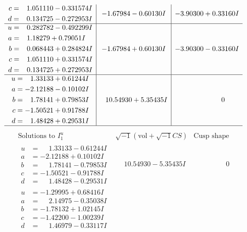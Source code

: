 \documentclass[1p]{elsarticle_modified}
\theoremstyle{definition}
\newcommand{\I}{\sqrt{-1}}
\begin{document}
$$\begin{array}{c|c|c}
\begin{aligned}
c &= \phantom{-}1.051110 - 0.331574 I \\
d &= \phantom{-}0.134725 - 0.272953 I\end{aligned}
 & -1.67984 - 0.60130 I & -3.90300 + 0.33160 I \\ \hline\begin{aligned}
u &= \phantom{-}0.282782 - 0.492299 I \\
a &= \phantom{-}1.18279 + 0.79051 I \\
b &= \phantom{-}0.068443 + 0.284824 I \\
c &= \phantom{-}1.051110 + 0.331574 I \\
d &= \phantom{-}0.134725 + 0.272953 I\end{aligned}
 & -1.67984 + 0.60130 I & -3.90300 - 0.33160 I \\ \hline\begin{aligned}
u &= \phantom{-}1.33133 + 0.61244 I \\
a &= -2.12188 - 0.10102 I \\
b &= \phantom{-}1.78141 + 0.79853 I \\
c &= -1.50521 + 0.91788 I \\
d &= \phantom{-}1.48428 + 0.29531 I\end{aligned}
 & \phantom{-}10.54930 + 5.35435 I & \phantom{-0.000000 } 0\\
 \hline 
 \end{array}$$\newpage$$\begin{array}{c|c|c}  
\text{Solutions to }I^u_{1}& \I (\text{vol} + \sqrt{-1}CS) & \text{Cusp shape}\\
 \hline 
\begin{aligned}
u &= \phantom{-}1.33133 - 0.61244 I \\
a &= -2.12188 + 0.10102 I \\
b &= \phantom{-}1.78141 - 0.79853 I \\
c &= -1.50521 - 0.91788 I \\
d &= \phantom{-}1.48428 - 0.29531 I\end{aligned}
 & \phantom{-}10.54930 - 5.35435 I & \phantom{-0.000000 } 0 \\ \hline\begin{aligned}
u &= -1.29995 + 0.68416 I \\
a &= \phantom{-}2.14975 - 0.35038 I \\
b &= -1.78132 + 1.02145 I \\
c &= -1.42200 - 1.00239 I \\
d &= \phantom{-}1.46979 - 0.33117 I\end{aligned}

\end{array}$$
\end{document}

